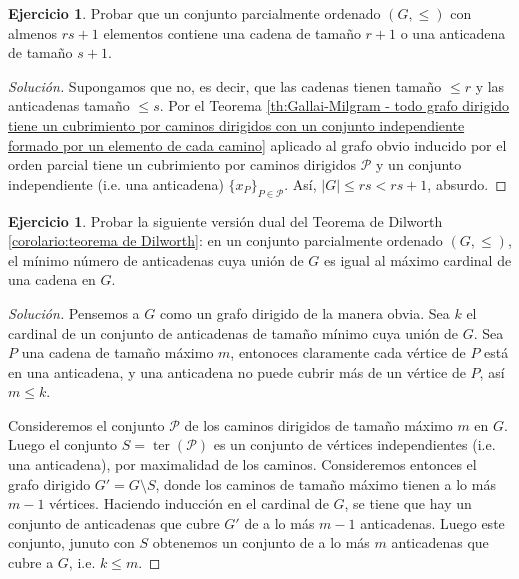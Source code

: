 \documentclass[12pt]{report}
\theoremstyle{plain}
\theoremstyle{definition}
\newtheorem{exercise}[theorem]{Ejercicio}
\newenvironment{solution}{\begin{proof}[Solución]}{\end{proof}}
\newcommand{\abs}[1]{\left \vert #1 \right \vert}
\newcommand{\ter}[1]{\operatorname{ter} (#1)}
\begin{document}
\begin{exercise}
Probar que un conjunto parcialmente ordenado $(G,\leq)$ con almenos $rs+1$ elementos contiene una cadena de tamaño $r+1$ o una anticadena de tamaño $s+1$.
\end{exercise}
\begin{solution}
Supongamos que no, es decir, que las cadenas tienen tamaño $\leq r$ y las anticadenas tamaño $\leq s$. Por el Teorema \ref{th:Gallai-Milgram - todo grafo dirigido tiene un cubrimiento por caminos dirigidos con un conjunto independiente formado por un elemento de cada camino} aplicado al grafo obvio inducido por el orden parcial tiene un cubrimiento por caminos dirigidos $\mathcal P$ y un conjunto independiente (i.e. una anticadena) $\{x_P\}_{P \in \mathcal P}$. Así, $\abs G \leq r s < rs +1$, absurdo.
\end{solution}

\begin{exercise}
Probar la siguiente versión dual del Teorema de Dilworth \ref{corolario:teorema de Dilworth}: en un conjunto parcialmente ordenado $(G, \leq)$, el mínimo número de anticadenas cuya unión de $G$ es igual al máximo cardinal de una cadena en $G$.
\end{exercise}
\begin{solution}
Pensemos a $G$ como un grafo dirigido de la manera obvia.
Sea $k$ el cardinal de un conjunto de anticadenas de tamaño mínimo cuya unión de $G$. Sea $P$ una cadena de tamaño máximo $m$, entonoces claramente cada vértice de $P$ está en una anticadena, y una anticadena no puede cubrir más de un vértice de $P$, así $m \leq k$.

Consideremos el conjunto $\mathcal P$ de los caminos dirigidos de tamaño máximo $m$ en $G$. Luego el conjunto $S = \ter {\mathcal P}$ es un conjunto de vértices independientes (i.e. una anticadena), por maximalidad de los caminos. Consideremos entonces el grafo dirigido $G' = G \setminus S$, donde los caminos de tamaño máximo tienen a lo más $m-1$ vértices. Haciendo inducción en el cardinal de $G$, se tiene que hay un conjunto de anticadenas que cubre $G'$ de a lo más $m-1$ anticadenas. Luego este conjunto, junuto con $S$ obtenemos un conjunto de a lo más $m$ anticadenas que cubre a $G$, i.e. $k \leq m$.
\end{solution}
\end{document}
